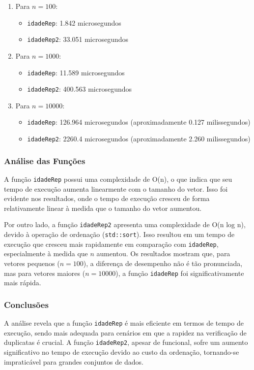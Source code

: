 \begin{enumerate}
    \item Para \( n = 100 \):
    \begin{itemize}
        \item \texttt{idadeRep}: 1.842 microsegundos
        \item \texttt{idadeRep2}: 33.051 microsegundos
    \end{itemize}

    \item Para \( n = 1000 \):
    \begin{itemize}
        \item \texttt{idadeRep}: 11.589 microsegundos
        \item \texttt{idadeRep2}: 400.563 microsegundos
    \end{itemize}

    \item Para \( n = 10000 \):
    \begin{itemize}
        \item \texttt{idadeRep}: 126.964 microsegundos (aproximadamente 0.127 milissegundos)
        \item \texttt{idadeRep2}: 2260.4 microsegundos (aproximadamente 2.260 milissegundos)
    \end{itemize}
\end{enumerate}

\subsubsection{Análise das Funções}
A função \texttt{idadeRep} possui uma complexidade de O(n), o que indica que seu tempo de execução aumenta linearmente com o tamanho do vetor. Isso foi evidente nos resultados, onde o tempo de execução cresceu de forma relativamente linear à medida que o tamanho do vetor aumentou.

Por outro lado, a função \texttt{idadeRep2} apresenta uma complexidade de O(n log n), devido à operação de ordenação (\texttt{std::sort}). Isso resultou em um tempo de execução que cresceu mais rapidamente em comparação com \texttt{idadeRep}, especialmente à medida que \( n \) aumentou. Os resultados mostram que, para vetores pequenos (\( n = 100 \)), a diferença de desempenho não é tão pronunciada, mas para vetores maiores (\( n = 10000 \)), a função \texttt{idadeRep} foi significativamente mais rápida.

\subsubsection{Conclusões}
A análise revela que a função \texttt{idadeRep} é mais eficiente em termos de tempo de execução, sendo mais adequada para cenários em que a rapidez na verificação de duplicatas é crucial. A função \texttt{idadeRep2}, apesar de funcional, sofre um aumento significativo no tempo de execução devido ao custo da ordenação, tornando-se impraticável para grandes conjuntos de dados.


